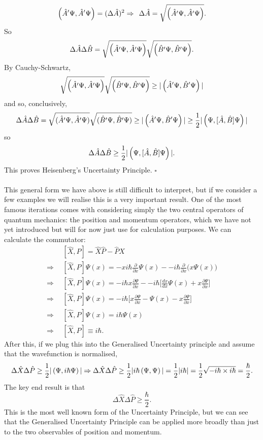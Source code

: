 $$
\left(\hat{A}'\Psi,\hat{A}'\Psi\right)=(\Delta\hat{A})^2\Rightarrow\:\:\Delta\hat{A}=\sqrt{\left(\hat{A}'\Psi,\hat{A}'\Psi\right)}.
$$
So 
$$
\Delta\hat{A}\Delta\hat{B}=\sqrt{\left(\hat{A}'\Psi,\hat{A}'\Psi\right)}\sqrt{\left(\hat{B}'\Psi,\hat{B}'\Psi\right)}.
$$
By Cauchy-Schwartz, 
$$
\sqrt{\left(\hat{A}'\Psi,\hat{A}'\Psi\right)}\sqrt{\left(\hat{B}'\Psi,\hat{B}'\Psi\right)}\geq|\left(\hat{A}'\Psi,\hat{B}'\Psi\right)|
$$
and so, conclusively,
$$
\Delta\hat{A}\Delta\hat{B}=\sqrt{(\hat{A}'\Psi,\hat{A}'\Psi)}\sqrt{(\hat{B}'\Psi,\hat{B}'\Psi)}\geq|\left(\hat{A}'\Psi,\hat{B}'\Psi\right)|\geq\frac{1}{2}|\left(\Psi,[\hat{A},\hat{B}]\Psi\right)|
$$
so 
$$
\Delta\hat{A}\Delta\hat{B}\geq\frac{1}{2}|\left(\Psi,[\hat{A},\hat{B}]\Psi\right)|.
$$
This proves Heisenberg's Uncertainty Principle. $\square$
\\\\
This general form we have above is still difficult to interpret, but if we consider a few examples we will realise this is a very important result. One of the most famous iterations comes with considering simply the two central operators of quantum mechanics: the position and momentum operators, which we have not yet introduced but will for now just use for calculation purposes. We can calculate the commutator:
$$
\begin{aligned}
&[\hat{X},\hat{P}]=\hat{X}\hat{P}-\hat{P}\hat{X}\\
\Rightarrow\:\:&[\hat{X},\hat{P}]\Psi(x)=-xi\hbar\frac{\partial}{\partial x}\Psi(x)--i\hbar\frac{\partial}{\partial x}\biggl(x\Psi(x)\biggr)\\
\Rightarrow\:\:&[\hat{X},\hat{P}]\Psi(x)=-i\hbar x\frac{\partial \Psi}{\partial x}--i\hbar\biggl[\frac{dx}{dx}\Psi(x)+x\frac{\partial\Psi}{\partial x}\biggr]\\
\Rightarrow\:\:&[\hat{X},\hat{P}]\Psi(x)=-i\hbar\biggl[x\frac{\partial\Psi}{\partial x}-\Psi(x)-x\frac{\partial\Psi}{\partial x}\biggr]\\
\Rightarrow\:\:&[\hat{X},\hat{P}]\Psi(x)=i\hbar\Psi(x)\\
\Rightarrow\:\:&[\hat{X},\hat{P}]\equiv i\hbar.
\end{aligned}
$$
After this, if we plug this into the Generalised Uncertainty principle and assume that the wavefunction is normalised,
$$
\Delta{\hat{X}}\Delta{\hat{P}}\geq\frac{1}{2}|\left(\Psi,i\hbar\Psi\right)| \Rightarrow \Delta{\hat{X}}\Delta{\hat{P}}\geq\frac{1}{2}|i\hbar\left(\Psi,\Psi\right)|=\frac{1}{2}|i\hbar|=\frac{1}{2}\sqrt{-i\hbar\times i\hbar}=\frac{\hbar}{2}.
$$
The key end result is that 
$$
\Delta{\hat{X}}\Delta{\hat{P}}\geq\frac{\hbar}{2}.
$$
This is the most well known form of the Uncertainty Principle, but we can see that the Generalised Uncertainty Principle can be applied more broadly than just to the two observables of position and momentum. 
